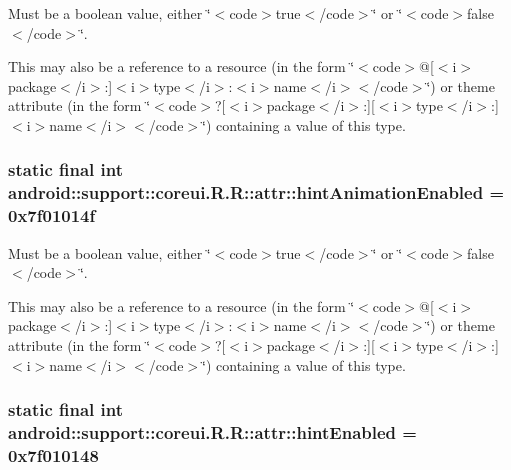 Must be a boolean value, either \char`\"{}$<$code$>$true$<$/code$>$\char`\"{} or \char`\"{}$<$code$>$false$<$/code$>$\char`\"{}. 

This may also be a reference to a resource (in the form \char`\"{}$<$code$>$@\mbox{[}$<$i$>$package$<$/i$>$:\mbox{]}$<$i$>$type$<$/i$>$:$<$i$>$name$<$/i$>$$<$/code$>$\char`\"{}) or theme attribute (in the form \char`\"{}$<$code$>$?\mbox{[}$<$i$>$package$<$/i$>$:\mbox{]}\mbox{[}$<$i$>$type$<$/i$>$:\mbox{]}$<$i$>$name$<$/i$>$$<$/code$>$\char`\"{}) containing a value of this type. \hypertarget{classandroid_1_1support_1_1coreui_1_1_r_1_1attr_7dd6dd12f585b90cb067dd660ea8c7c9}{
\subsubsection[{hintAnimationEnabled}]{\setlength{\rightskip}{0pt plus 5cm}static final int android::support::coreui.R.R::attr::hintAnimationEnabled = 0x7f01014f}}
\label{classandroid_1_1support_1_1coreui_1_1_r_1_1attr_7dd6dd12f585b90cb067dd660ea8c7c9}


Must be a boolean value, either \char`\"{}$<$code$>$true$<$/code$>$\char`\"{} or \char`\"{}$<$code$>$false$<$/code$>$\char`\"{}. 

This may also be a reference to a resource (in the form \char`\"{}$<$code$>$@\mbox{[}$<$i$>$package$<$/i$>$:\mbox{]}$<$i$>$type$<$/i$>$:$<$i$>$name$<$/i$>$$<$/code$>$\char`\"{}) or theme attribute (in the form \char`\"{}$<$code$>$?\mbox{[}$<$i$>$package$<$/i$>$:\mbox{]}\mbox{[}$<$i$>$type$<$/i$>$:\mbox{]}$<$i$>$name$<$/i$>$$<$/code$>$\char`\"{}) containing a value of this type. \hypertarget{classandroid_1_1support_1_1coreui_1_1_r_1_1attr_f83006744de0191c9d4bd62a3c59de32}{
\subsubsection[{hintEnabled}]{\setlength{\rightskip}{0pt plus 5cm}static final int android::support::coreui.R.R::attr::hintEnabled = 0x7f010148}}
\label{classandroid_1_1support_1_1coreui_1_1_r_1_1attr_f83006744de0191c9d4bd62a3c59de32}


